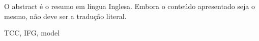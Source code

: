 O abstract é o resumo em língua Inglesa. 
Embora o conteúdo apresentado seja o mesmo, não deve ser a tradução literal.

\begin{keywords}
TCC, IFG, model
\end{keywords}